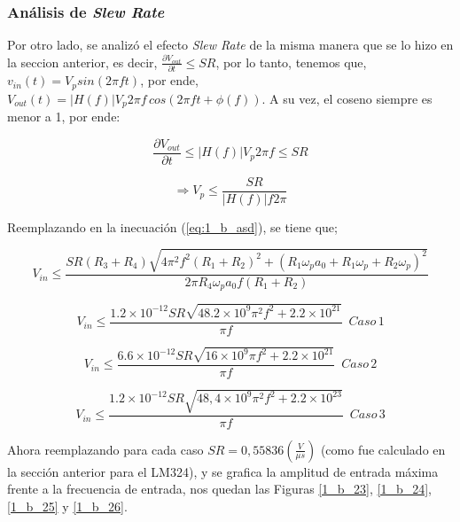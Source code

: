 \subsubsection{Análisis de \emph{Slew Rate}}

Por otro lado, se analizó el efecto \emph{Slew Rate }de la misma manera
que se lo hizo en la seccion anterior, es decir, $\frac{\partial V_{out}}{\partial t}\leq SR$,
por lo tanto, tenemos que, $v_{in}(t)=V_{p}sin(2\pi ft)$, por ende,
$V_{out}(t)=\left|H(f)\right|V_{p}2\pi f\,cos(2\pi ft+\phi(f))$.
A su vez, el coseno siempre es menor a 1, por ende:

\[
\frac{\partial V_{out}}{\partial t}\leq\left|H(f)\right|V_{p}2\pi f\leq SR
\]

\begin{equation}
\Rightarrow V_{p}\leq\frac{SR}{\left|H(f)\right|f2\pi}\label{eq:1_b_asd}
\end{equation}

Reemplazando en la inecuación (\ref{eq:1_b_asd}), se tiene que;

\[
V_{in}\leq\frac{SR\left(R_{3}+R_{4}\right)\sqrt{4\pi^{2}f^{2}\left(R_{1}+R_{2}\right)^{2}+\left(R_{1}\omega_{p}a_{0}+R_{1}\omega_{p}+R_{2}\omega_{p}\right)^{2}}}{2\pi R_{4}\omega_{p}a_{0}f\left(R_{1}+R_{2}\right)}
\]

\[
V_{in}\leq\frac{1.2\times10^{-12}SR\sqrt{48.2\times10^{9}\pi^{2}f^{2}+2.2\times10^{21}}}{\pi f}\,\,\,Caso\,1
\]

\[
V_{in}\leq\frac{6.6\times10^{-12}SR\sqrt{16\times10^{9}\pi f^{2}+2.2\times10^{21}}}{\pi f}\,\,\,Caso\,2
\]

\[
V_{in}\leq\frac{1.2\times10^{-12}SR\sqrt{48,4\times10^{9}\pi^{2}f^{2}+2.2\times10^{23}}}{\pi f}\,\,\,Caso\,3
\]

Ahora reemplazando para cada caso $SR=0,55836\left(\frac{V}{\mu s}\right)$
(como fue calculado en la sección anterior para el LM324), y se grafica
la amplitud de entrada máxima frente a la frecuencia de entrada, nos
quedan las Figuras \ref{1_b_23}, \ref{1_b_24}, \ref{1_b_25} y \ref{1_b_26}.

